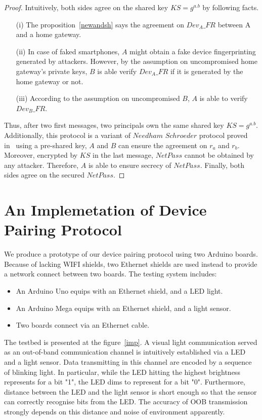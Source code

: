 \begin{proof}

Intuitively, both sides agree on the shared key $KS = g^{a.b}$ by following facts. 
\begin{enumerate}
\item [(i)] The proposition~\ref{newandsh} says the agreement on $Dev_{A}\_FR$ between A and a home gateway.
\item [(ii)] In case of faked smartphones, $A$ might obtain a fake device fingerprinting generated by attackers. However, by the assumption on uncompromised home gateway's private keys, $B$ is able verify $Dev_{A}\_FR$ if it is generated by the home gateway or not. 
\item [(iii)] According to the assumption on uncompromised $B$, $A$ is able to verify $Dev_{B}\_FR$. 
\end{enumerate}

Thus, after two first messages, two principals own the same shared key $KS = g^{a.b}$. Additionally, this protocol is a variant of $Needham$ $Schroeder$ protocol proved in~\cite{674832} using a pre-shared key, $A$ and $B$ can ensure the agreement on $r_a$ and $r_b$. 
Moreover, encrypted by $KS$ in the last message, $NetPass$ cannot be obtained by any attacker. Therefore, $A$ is able to ensure secrecy of $NetPass$. Finally, both sides agree on the secured $NetPass$. 
\end{proof}

\section{An Implemetation of Device Pairing Protocol} 

We produce a prototype of our device pairing protocol using two Arduino boards. Because of lacking WIFI shields, two Ethernet shields are used instead to provide a network connect between two boards. The testing system includes:
\begin{itemize}
\item An Arduino Uno equips with an Ethernet shield, and a LED light.
\item An Arduino Mega equips with an Ethernet shield, and a light sensor.
\item Two boards connect via an Ethernet cable. 
\end{itemize}

The testbed is presented at the figure~\ref{imp}. A visual light communication served as an out-of-band communication channel is intuitively established via a LED and a light sensor. Data transmitting in this channel are encoded by a sequence of blinking light. In particular, while the LED hitting the highest brightness represents for a bit "1", the LED dims to represent for a bit "0". Furthermore, distance between the LED and the light sensor is short enough so that the sensor can correctly recognise bits from the LED. The accuracy of OOB transmission strongly depends on this distance and noise of environment apparently. 

